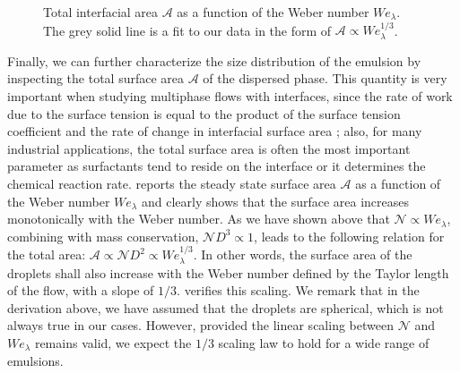 \begin{figure}
	\centering
	 \vspace{0.5cm}
	\caption{Total interfacial area $\mathcal{A}$ as a function of the Weber number $We_\lambda$. The grey solid line is a fit to our data in the form of $\mathcal{A} \propto We_\lambda^{1/3}$.}
	\label{fig:surf}
\end{figure}
Finally, we can further characterize the size distribution of the emulsion by inspecting the total surface area $\mathcal{A}$ of the dispersed phase. This quantity is very important when studying multiphase flows with interfaces, since the rate of work due to the surface tension is equal to the product of the surface tension coefficient and the rate of change in interfacial surface area \citep{dodd_ferrante_2016a}; also, for many industrial applications, the total surface area is often the most important parameter as surfactants tend to reside on the interface or it determines the chemical reaction rate.  reports the steady state surface area $\mathcal{A}$ as a function of the Weber number $We_\lambda$ and clearly shows that the surface area increases monotonically with the Weber number. As we have shown above that $\mathcal{N} \propto We_\lambda$, combining with mass conservation, \ie $\mathcal{N} D^3 \propto 1$, leads to the following relation for the total area: $\mathcal{A} \propto \mathcal{N} D^2 \propto We_\lambda^{1/3}$. In other words, the surface area of the droplets shall also increase with the Weber number defined by the Taylor length of the flow, with a slope of $1/3$.  verifies this scaling. We remark that in the derivation above, we have assumed that the droplets are spherical, which is not always true in our cases. However, provided the linear scaling between $\mathcal{N}$ and $We_\lambda$ remains valid, we expect the $1/3$ scaling law to hold for a wide range of emulsions.

